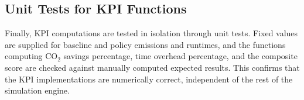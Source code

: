 \subsection{Unit Tests for KPI Functions}

Finally, KPI computations are tested in isolation through unit tests.  Fixed
values are supplied for baseline and policy emissions and runtimes, and the
functions computing CO$_2$ savings percentage, time overhead percentage, and
the composite score are checked against manually computed expected results.
This confirms that the KPI implementations are numerically correct,
independent of the rest of the simulation engine.

